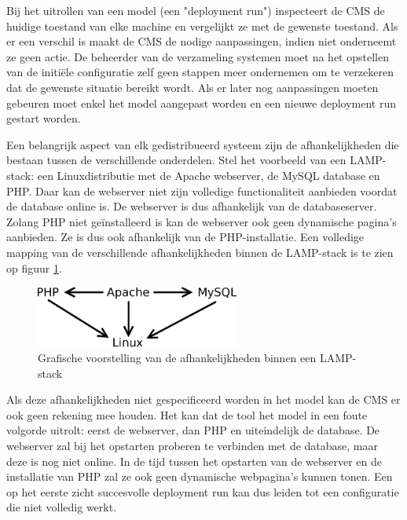 Bij het uitrollen van een model (een "deployment run") inspecteert de CMS de huidige toestand van elke machine en vergelijkt ze met de gewenste toestand.
Als er een verschil is maakt de CMS de nodige aanpassingen, indien niet onderneemt ze geen actie.
De beheerder van de verzameling systemen moet na het opstellen van de initi\"ele configuratie zelf geen stappen meer ondernemen om te verzekeren dat de gewenste situatie bereikt wordt.
Als er later nog aanpassingen moeten gebeuren moet enkel het model aangepast worden en een nieuwe deployment run gestart worden.

Een belangrijk aspect van elk gedistribueerd systeem zijn de afhankelijkheden die bestaan tussen de verschillende onderdelen.
Stel het voorbeeld van een LAMP-stack: een Linuxdistributie met de Apache webserver, de MySQL database en PHP.
Daar kan de webserver niet zijn volledige functionaliteit aanbieden voordat de database online is.
De webserver is dus afhankelijk van de databaseserver.
Zolang PHP niet ge\"installeerd is kan de webserver ook geen dynamische pagina's aanbieden.
Ze is dus ook afhankelijk van de PHP-installatie. 
Een volledige mapping van de verschillende afhankelijkheden binnen de LAMP-stack is te zien op figuur \ref{fig:lamp_dep}.

\begin{figure}[h]
    \begin{center}
    \includegraphics[width=0.6\textwidth]{images/lamp_dep.pdf}
    \caption{Grafische voorstelling van de afhankelijkheden binnen een LAMP-stack}
    \label{fig:lamp_dep}
    \end{center}
\end{figure}

Als deze afhankelijkheden niet gespecificeerd worden in het model kan de CMS er ook geen rekening mee houden.
Het kan dat de tool het model in een foute volgorde uitrolt: eerst de webserver, dan PHP en uiteindelijk de database.
De webserver zal bij het opstarten proberen te verbinden met de database, maar deze is nog niet online.
In de tijd tussen het opstarten van de webserver en de installatie van PHP zal ze ook geen dynamische webpagina's kunnen tonen.
Een op het eerste zicht succesvolle deployment run kan dus leiden tot een configuratie die niet volledig werkt.

